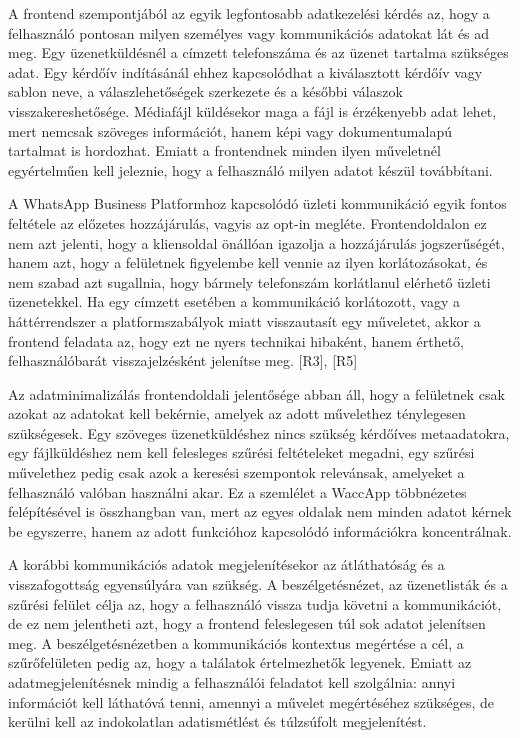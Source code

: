 A frontend szempontjából az egyik legfontosabb adatkezelési kérdés az, hogy a felhasználó pontosan milyen személyes vagy kommunikációs adatokat lát és ad meg. Egy üzenetküldésnél a címzett telefonszáma és az üzenet tartalma szükséges adat. Egy kérdőív indításánál ehhez kapcsolódhat a kiválasztott kérdőív vagy sablon neve, a válaszlehetőségek szerkezete és a későbbi válaszok visszakereshetősége. Médiafájl küldésekor maga a fájl is érzékenyebb adat lehet, mert nemcsak szöveges információt, hanem képi vagy dokumentumalapú tartalmat is hordozhat. Emiatt a frontendnek minden ilyen műveletnél egyértelműen kell jeleznie, hogy a felhasználó milyen adatot készül továbbítani.

A WhatsApp Business Platformhoz kapcsolódó üzleti kommunikáció egyik fontos feltétele az előzetes hozzájárulás, vagyis az opt-in megléte. Frontendoldalon ez nem azt jelenti, hogy a kliensoldal önállóan igazolja a hozzájárulás jogszerűségét, hanem azt, hogy a felületnek figyelembe kell vennie az ilyen korlátozásokat, és nem szabad azt sugallnia, hogy bármely telefonszám korlátlanul elérhető üzleti üzenetekkel. Ha egy címzett esetében a kommunikáció korlátozott, vagy a háttérrendszer a platformszabályok miatt visszautasít egy műveletet, akkor a frontend feladata az, hogy ezt ne nyers technikai hibaként, hanem érthető, felhasználóbarát visszajelzésként jelenítse meg. [R3], [R5]

Az adatminimalizálás frontendoldali jelentősége abban áll, hogy a felületnek csak azokat az adatokat kell bekérnie, amelyek az adott művelethez ténylegesen szükségesek. Egy szöveges üzenetküldéshez nincs szükség kérdőíves metaadatokra, egy fájlküldéshez nem kell felesleges szűrési feltételeket megadni, egy szűrési művelethez pedig csak azok a keresési szempontok relevánsak, amelyeket a felhasználó valóban használni akar. Ez a szemlélet a WaccApp többnézetes felépítésével is összhangban van, mert az egyes oldalak nem minden adatot kérnek be egyszerre, hanem az adott funkcióhoz kapcsolódó információkra koncentrálnak.

A korábbi kommunikációs adatok megjelenítésekor az átláthatóság és a visszafogottság egyensúlyára van szükség. A beszélgetésnézet, az üzenetlisták és a szűrési felület célja az, hogy a felhasználó vissza tudja követni a kommunikációt, de ez nem jelentheti azt, hogy a frontend feleslegesen túl sok adatot jelenítsen meg. A beszélgetésnézetben a kommunikációs kontextus megértése a cél, a szűrőfelületen pedig az, hogy a találatok értelmezhetők legyenek. Emiatt az adatmegjelenítésnek mindig a felhasználói feladatot kell szolgálnia: annyi információt kell láthatóvá tenni, amennyi a művelet megértéséhez szükséges, de kerülni kell az indokolatlan adatismétlést és túlzsúfolt megjelenítést.

